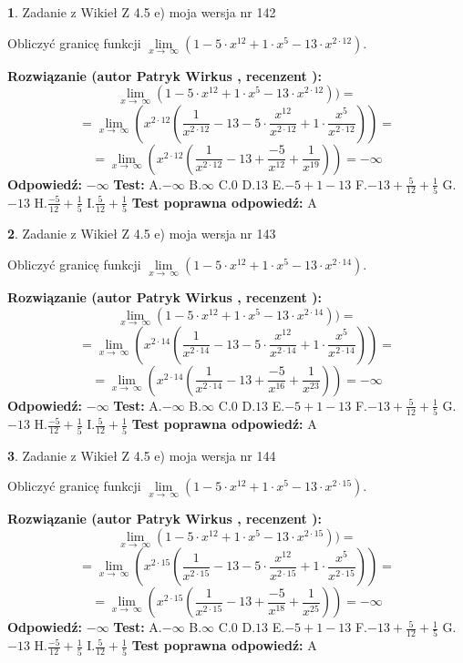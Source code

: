 \documentclass[12pt, a4paper]{article}
\theoremstyle{definition} %
\newtheorem{zad}{}
\newcommand{\zadStart}[1]{\begin{zad}#1\newline}
\newcommand{\zadStop}{\end{zad}}
\newcommand{\rozwStart}[2]{\noindent \textbf{Rozwiązanie (autor #1 , recenzent #2): }\newline}
\newcommand{\rozwStop}{\newline}
\newcommand{\odpStart}{\noindent \textbf{Odpowiedź:}\newline}
\newcommand{\odpStop}{\newline}
\newcommand{\testStart}{\noindent \textbf{Test:}\newline}
\newcommand{\testStop}{\newline}
\newcommand{\kluczStart}{\noindent \textbf{Test poprawna odpowiedź:}\newline}
\newcommand{\kluczStop}{\newline}
\begin{document}
\zadStart{Zadanie z Wikieł Z 4.5 e) moja wersja nr 142}



Obliczyć granicę funkcji  $\lim\limits_{x\to\ \infty}(1 - 5 \cdot x^{12}+1 \cdot x^{5}- 13 \cdot x^{2\cdot12})$.
\zadStop
\rozwStart{Patryk Wirkus}{}
$$\lim\limits_{x\to\ \infty}(1 - 5 \cdot x^{12}+1 \cdot x^{5}- 13 \cdot x^{2\cdot12}))=$$
$$=\lim\limits_{x\to\ \infty}(x^{2\cdot12}(\frac{1}{x^{2\cdot12}}-13 -5 \cdot \frac{x^{12}}{x^{2\cdot12}}+1 \cdot \frac{x^{5}}{x^{2\cdot12}}))=$$
$$=\lim\limits_{x\to\ \infty}(x^{2\cdot12}(\frac{1}{x^{2\cdot12}}-13 + \frac{-5}{x^{12}}+ \frac{1}{x^{19}}))=-\infty$$
\rozwStop
\odpStart
$-\infty$
\odpStop
\testStart
A.$-\infty$ B.$\infty$ C.$0$ D.$13$ E.$-5 + 1 - 13$
F.$-13+\frac{5}{12}+\frac{1}{5}$ G.$-13$
H.$\frac{-5}{12}+\frac{1}{5}$
I.$\frac{5}{12}+\frac{1}{5}$
\testStop
\kluczStart
A
\kluczStop



\zadStart{Zadanie z Wikieł Z 4.5 e) moja wersja nr 143}



Obliczyć granicę funkcji  $\lim\limits_{x\to\ \infty}(1 - 5 \cdot x^{12}+1 \cdot x^{5}- 13 \cdot x^{2\cdot14})$.
\zadStop
\rozwStart{Patryk Wirkus}{}
$$\lim\limits_{x\to\ \infty}(1 - 5 \cdot x^{12}+1 \cdot x^{5}- 13 \cdot x^{2\cdot14}))=$$
$$=\lim\limits_{x\to\ \infty}(x^{2\cdot14}(\frac{1}{x^{2\cdot14}}-13 -5 \cdot \frac{x^{12}}{x^{2\cdot14}}+1 \cdot \frac{x^{5}}{x^{2\cdot14}}))=$$
$$=\lim\limits_{x\to\ \infty}(x^{2\cdot14}(\frac{1}{x^{2\cdot14}}-13 + \frac{-5}{x^{16}}+ \frac{1}{x^{23}}))=-\infty$$
\rozwStop
\odpStart
$-\infty$
\odpStop
\testStart
A.$-\infty$ B.$\infty$ C.$0$ D.$13$ E.$-5 + 1 - 13$
F.$-13+\frac{5}{12}+\frac{1}{5}$ G.$-13$
H.$\frac{-5}{12}+\frac{1}{5}$
I.$\frac{5}{12}+\frac{1}{5}$
\testStop
\kluczStart
A
\kluczStop



\zadStart{Zadanie z Wikieł Z 4.5 e) moja wersja nr 144}



Obliczyć granicę funkcji  $\lim\limits_{x\to\ \infty}(1 - 5 \cdot x^{12}+1 \cdot x^{5}- 13 \cdot x^{2\cdot15})$.
\zadStop
\rozwStart{Patryk Wirkus}{}
$$\lim\limits_{x\to\ \infty}(1 - 5 \cdot x^{12}+1 \cdot x^{5}- 13 \cdot x^{2\cdot15}))=$$
$$=\lim\limits_{x\to\ \infty}(x^{2\cdot15}(\frac{1}{x^{2\cdot15}}-13 -5 \cdot \frac{x^{12}}{x^{2\cdot15}}+1 \cdot \frac{x^{5}}{x^{2\cdot15}}))=$$
$$=\lim\limits_{x\to\ \infty}(x^{2\cdot15}(\frac{1}{x^{2\cdot15}}-13 + \frac{-5}{x^{18}}+ \frac{1}{x^{25}}))=-\infty$$
\rozwStop
\odpStart
$-\infty$
\odpStop
\testStart
A.$-\infty$ B.$\infty$ C.$0$ D.$13$ E.$-5 + 1 - 13$
F.$-13+\frac{5}{12}+\frac{1}{5}$ G.$-13$
H.$\frac{-5}{12}+\frac{1}{5}$
I.$\frac{5}{12}+\frac{1}{5}$
\testStop
\kluczStart
A
\kluczStop
\end{document}
